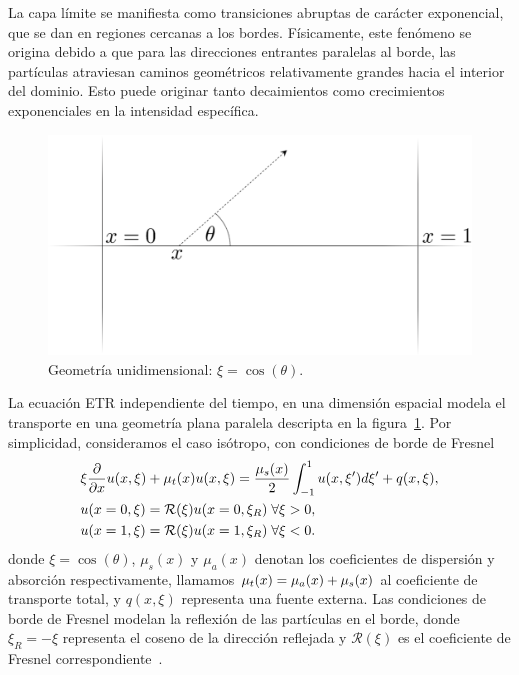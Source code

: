 La capa límite se manifiesta como transiciones abruptas de 
 carácter exponencial, que se dan en regiones cercanas a los bordes. 
Físicamente, este fenómeno se origina debido a que para las direcciones entrantes paralelas 
al borde, las partículas atraviesan caminos geométricos relativamente grandes 
hacia el interior del dominio. Esto puede originar tanto decaimientos 
como crecimientos exponenciales en la intensidad específica.
\begin{figure}[h!]
\centering
  \includegraphics[width=0.5\linewidth]{figuras/geom.pdf}
  \caption{Geometría unidimensional: $\xi = \cos(\theta)$.}
 \label{fig:parallelgeom}
\end{figure}
La ecuación ETR independiente del tiempo, en una dimensión espacial 
modela el transporte en una geometría plana paralela descripta en la 
figura~\ref{fig:parallelgeom}. Por simplicidad, consideramos 
el caso isótropo, con condiciones de borde de Fresnel
\begin{equation}
\begin{split}
  &\xi \frac{\partial}{\partial x}u(x,\xi)+\mu_t(x)u(x,\xi)=   \frac{\mu_s(x)}{2} \int_{-1}^{1}u(x,\xi') d\xi' +q(x,\xi),\\
  &u(x=0,\xi)=\mathcal{R}(\xi)u(x=0,\xi_R) \; \forall \xi>0,\\
  &u(x=1,\xi)=\mathcal{R}(\xi)u(x=1,\xi_R) \; \forall \xi<0.
\end{split}
\label{eq:transp1d}
\end{equation}
donde $\xi=\cos(\theta)$,  $\mu_s(x)$ y $\mu_a(x)$ denotan 
los coeficientes de dispersión y absorción respectivamente, 
llamamos $\mu_t(x)=\mu_a(x)+\mu_s(x)$ al coeficiente de transporte 
total, y $q(x,\xi)$ representa una fuente externa. Las condiciones de 
borde de Fresnel modelan la reflexión de las partículas en el borde, 
donde $\xi_R=-\xi$ representa el coseno de la dirección reflejada 
y $\mathcal{R}(\xi)$ es el coeficiente de Fresnel correspondiente~\cite{Born1999}.


